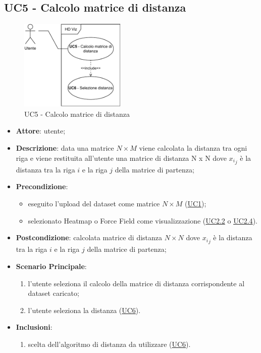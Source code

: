\subsection{UC5 - Calcolo matrice di distanza}
    \label{uc5}
    
    \begin{figure}[htbp]
        \centering
        \includegraphics[width=0.45\textwidth]{source/sections/casi-uso/diagrams/uc5.pdf}
        \caption{UC5 - Calcolo matrice di distanza}
        \label{fig:uc5}
    \end{figure}
    
    \begin{itemize}
    \item \textbf{Attore}: utente;
    \item \textbf{Descrizione}: data una matrice $N \times M$ viene calcolata la distanza tra ogni riga e viene restituita all'utente una matrice di distanza N x N dove ${x_i}_j$ è la distanza tra la riga $i$ e la riga $j$ della matrice di partenza;
    \item \textbf{Precondizione}: 
    \begin{itemize}
        \item eseguito l'upload del dataset come matrice $N\times M$ (\hyperref[uc1]{UC1});
        \item selezionato Heatmap o Force Field come visualizzazione (\hyperref[uc2.2]{UC2.2} o \hyperref[uc2.4]{UC2.4}).
    \end{itemize}  
    \item \textbf{Postcondizione}: calcolata matrice di distanza $N \times N$ dove ${x_i}_j$ è la distanza tra la riga $i$ e la riga $j$ della matrice di partenza;
    \item \textbf{Scenario Principale}: 
    \begin{enumerate}
        \item l'utente seleziona il calcolo della matrice di distanza corrispondente al dataset caricato;
        \item l'utente seleziona la distanza (\hyperref[uc6]{UC6}).
    \end{enumerate}  
    \item \textbf{Inclusioni}:
        \begin{enumerate}
            \item scelta dell'algoritmo di distanza da utilizzare (\hyperref[uc6]{UC6}).
        \end{enumerate} 
    \end{itemize}